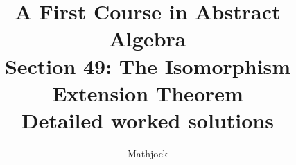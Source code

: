 
\title{\textbf{A First Course in Abstract Algebra}\\[0.3em]Section 49: The Isomorphism Extension Theorem\\[0.3em]\large Detailed worked solutions}
\author{Mathjock}
\date{}

\maketitle
\bookinfo
\tableofcontents
\clearpage
\renewcommand{\thesection}{49}
\renewcommand{\theHsection}{fraleigh.49}


